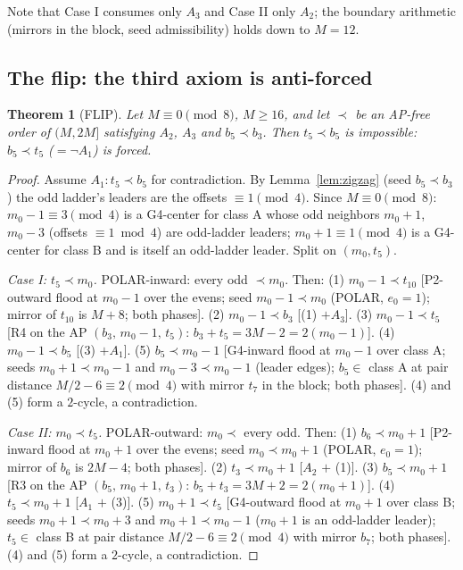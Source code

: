 \documentclass[11pt]{article}
\newtheorem{theorem}{Theorem}
\theoremstyle{definition}
\begin{document}
Note that Case I consumes only $A_3$ and Case II only $A_2$; the
boundary arithmetic (mirrors in the block, seed admissibility) holds
down to $M = 12$.

\subsection{The flip: the third axiom is anti-forced}\label{sec:flip}

\begin{theorem}[FLIP]\label{thm:flip}
Let $M \equiv 0 \pmod 8$, $M \ge 16$, and let $\prec$ be an AP-free
order of $(M, 2M]$ satisfying $A_2$, $A_3$ and $b_5 \prec b_3$. Then
$t_5 \prec b_5$ is impossible: $b_5 \prec t_5$ ($= \lnot A_1$) is
forced.
\end{theorem}

\begin{proof}
Assume $A_1\colon t_5 \prec b_5$ for contradiction. By
Lemma~\ref{lem:zigzag} (seed $b_5 \prec b_3$) the odd ladder's leaders
are the offsets $\equiv 1 \pmod 4$. Since $M \equiv 0 \pmod 8$:
$m_0 - 1 \equiv 3 \pmod 4$ is a G4-center for class A whose odd
neighbors $m_0 + 1$, $m_0 - 3$ (offsets $\equiv 1 \bmod 4$) are
odd-ladder leaders; $m_0 + 1 \equiv 1 \pmod 4$ is a G4-center for
class B and is itself an odd-ladder leader. Split on $(m_0, t_5)$.

\emph{Case I: $t_5 \prec m_0$.} POLAR-inward: every odd ${}\prec m_0$.
Then:
(1) $m_0 - 1 \prec t_{10}$ [P2-outward flood at $m_0 - 1$ over the
evens; seed $m_0 - 1 \prec m_0$ (POLAR, $e_0 = 1$); mirror of
$t_{10}$ is $M + 8$; both phases].
(2) $m_0 - 1 \prec b_3$ [(1) $+ A_3$].
(3) $m_0 - 1 \prec t_5$ [R4 on the AP $(b_3,\, m_0 - 1,\, t_5)$:
$b_3 + t_5 = 3M - 2 = 2(m_0 - 1)$].
(4) $m_0 - 1 \prec b_5$ [(3) $+ A_1$].
(5) $b_5 \prec m_0 - 1$ [G4-inward flood at $m_0 - 1$ over class A;
seeds $m_0 + 1 \prec m_0 - 1$ and $m_0 - 3 \prec m_0 - 1$ (leader
edges); $b_5 \in$ class A at pair distance $M/2 - 6 \equiv 2 \pmod 4$
with mirror $t_7$ in the block; both phases].
(4) and (5) form a $2$-cycle, a contradiction.

\emph{Case II: $m_0 \prec t_5$.} POLAR-outward: $m_0 \prec$ every odd.
Then:
(1) $b_6 \prec m_0 + 1$ [P2-inward flood at $m_0 + 1$ over the evens;
seed $m_0 \prec m_0 + 1$ (POLAR, $e_0 = 1$); mirror of $b_6$ is
$2M - 4$; both phases].
(2) $t_3 \prec m_0 + 1$ [$A_2$ $+$ (1)].
(3) $b_5 \prec m_0 + 1$ [R3 on the AP $(b_5,\, m_0 + 1,\, t_3)$:
$b_5 + t_3 = 3M + 2 = 2(m_0 + 1)$].
(4) $t_5 \prec m_0 + 1$ [$A_1$ $+$ (3)].
(5) $m_0 + 1 \prec t_5$ [G4-outward flood at $m_0 + 1$ over class B;
seeds $m_0 + 1 \prec m_0 + 3$ and $m_0 + 1 \prec m_0 - 1$ ($m_0 + 1$
is an odd-ladder leader); $t_5 \in$ class B at pair distance
$M/2 - 6 \equiv 2 \pmod 4$ with mirror $b_7$; both phases].
(4) and (5) form a $2$-cycle, a contradiction.
\end{proof}
\end{document}
